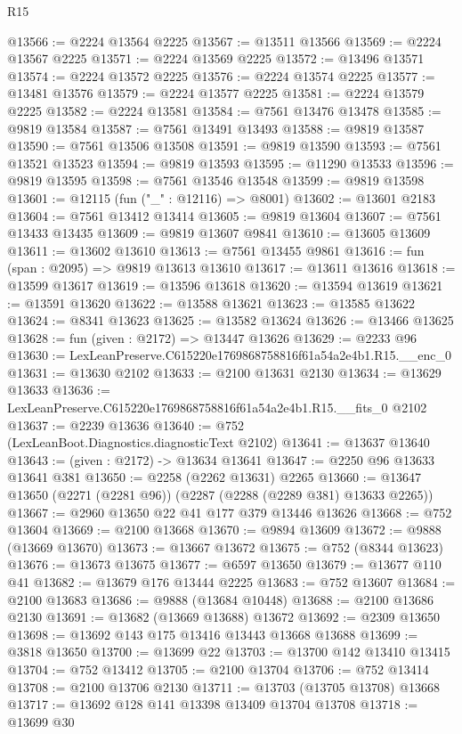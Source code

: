 \begin{lexlean}{R15}
\begin{coremodule}
@13566 := @2224 @13564 @2225
@13567 := @13511 @13566
@13569 := @2224 @13567 @2225
@13571 := @2224 @13569 @2225
@13572 := @13496 @13571
@13574 := @2224 @13572 @2225
@13576 := @2224 @13574 @2225
@13577 := @13481 @13576
@13579 := @2224 @13577 @2225
@13581 := @2224 @13579 @2225
@13582 := @2224 @13581
@13584 := @7561 @13476 @13478
@13585 := @9819 @13584
@13587 := @7561 @13491 @13493
@13588 := @9819 @13587
@13590 := @7561 @13506 @13508
@13591 := @9819 @13590
@13593 := @7561 @13521 @13523
@13594 := @9819 @13593
@13595 := @11290 @13533
@13596 := @9819 @13595
@13598 := @7561 @13546 @13548
@13599 := @9819 @13598
@13601 := @12115 (fun ("_" : @12116) => @8001)
@13602 := @13601 @2183
@13604 := @7561 @13412 @13414
@13605 := @9819 @13604
@13607 := @7561 @13433 @13435
@13609 := @9819 @13607 @9841
@13610 := @13605 @13609
@13611 := @13602 @13610
@13613 := @7561 @13455 @9861
@13616 := fun (span : @2095) => @9819 @13613 @13610
@13617 := @13611 @13616
@13618 := @13599 @13617
@13619 := @13596 @13618
@13620 := @13594 @13619
@13621 := @13591 @13620
@13622 := @13588 @13621
@13623 := @13585 @13622
@13624 := @8341 @13623
@13625 := @13582 @13624
@13626 := @13466 @13625
@13628 := fun (given : @2172) => @13447 @13626
@13629 := @2233 @96
@13630 := LexLeanPreserve.C615220e1769868758816f61a54a2e4b1.R15.__enc_0
@13631 := @13630 @2102
@13633 := @2100 @13631 @2130
@13634 := @13629 @13633
@13636 := LexLeanPreserve.C615220e1769868758816f61a54a2e4b1.R15.__fits_0 @2102
@13637 := @2239 @13636
@13640 := @752 (LexLeanBoot.Diagnostics.diagnosticText @2102)
@13641 := @13637 @13640
@13643 := (given : @2172) -> @13634 @13641
@13647 := @2250 @96 @13633 @13641 @381
@13650 := @2258 (@2262 @13631) @2265
@13660 := @13647 @13650 (@2271 (@2281 @96)) (@2287 (@2288 (@2289 @381) @13633 @2265))
@13667 := @2960 @13650 @22 @41 @177 @379 @13446 @13626
@13668 := @752 @13604
@13669 := @2100 @13668
@13670 := @9894 @13609
@13672 := @9888 (@13669 @13670)
@13673 := @13667 @13672
@13675 := @752 (@8344 @13623)
@13676 := @13673 @13675
@13677 := @6597 @13650
@13679 := @13677 @110 @41
@13682 := @13679 @176 @13444 @2225
@13683 := @752 @13607
@13684 := @2100 @13683
@13686 := @9888 (@13684 @10448)
@13688 := @2100 @13686 @2130
@13691 := @13682 (@13669 @13688) @13672
@13692 := @2309 @13650
@13698 := @13692 @143 @175 @13416 @13443 @13668 @13688
@13699 := @3818 @13650
@13700 := @13699 @22
@13703 := @13700 @142 @13410 @13415
@13704 := @752 @13412
@13705 := @2100 @13704
@13706 := @752 @13414
@13708 := @2100 @13706 @2130
@13711 := @13703 (@13705 @13708) @13668
@13717 := @13692 @128 @141 @13398 @13409 @13704 @13708
@13718 := @13699 @30

\end{coremodule}
\end{lexlean}
